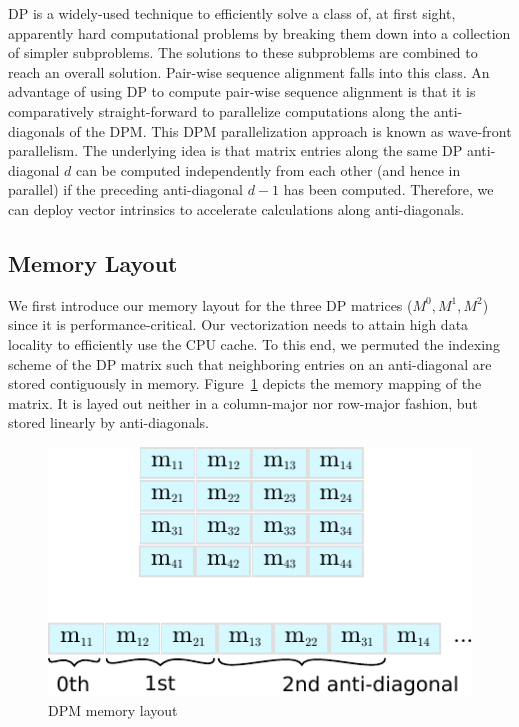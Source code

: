 \documentclass[runningheads,a4paper]{llncs}
\begin{document}
DP is a widely-used technique to efficiently solve a class of, at first sight, apparently hard computational problems by breaking them down
into a collection of simpler subproblems. The solutions to these subproblems are combined to reach an overall solution.
Pair-wise sequence alignment falls into this class. 
An advantage of using DP to compute pair-wise sequence alignment is that it is comparatively straight-forward to parallelize computations along the anti-diagonals 
of the DPM. 
This DPM parallelization approach is known as wave-front parallelism. 
The underlying idea is that matrix entries along the same DP anti-diagonal $d$ can be computed independently from each other (and hence in parallel) 
if the preceding anti-diagonal $d-1$ has been computed. 
Therefore, we can deploy vector intrinsics to accelerate calculations along anti-diagonals.


\subsection{Memory Layout}
\label{ssec:memorylayout}

We first introduce our memory layout for the three DP matrices ($M^0, M^1, M^2$) since it is performance-critical.
Our vectorization needs to attain high data locality to efficiently use the CPU cache.
To this end,  we permuted the indexing scheme of the DP matrix such that neighboring entries on an anti-diagonal are stored contiguously in memory. 
Figure~\ref{fig:indexing} depicts the memory mapping of the matrix. 
It is layed out neither in a column-major nor row-major fashion, but stored linearly by anti-diagonals. 

\begin{figure}[ht!]
  \centering
  \includegraphics[scale=0.9]{figures/indexing.pdf}
  \caption{DPM memory layout}
  \label{fig:indexing}
\end{figure}
\end{document}
